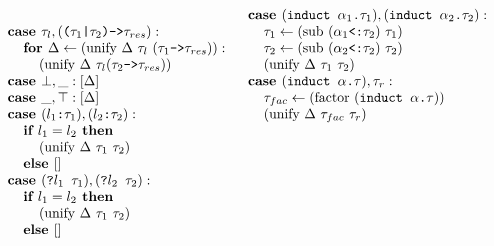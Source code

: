 \documentclass[acmsmall]{acmart}
\begin{document}
\begin{figure*}[h]
\[\begin{array}[t]{@{} l}
    \\

    \I \B{case } \tau_l, (\code{($\tau_1$|$\tau_2$)->$\tau_{res}$}) : 
    \\
    \I\I \B{for } \Delta \leftarrow (\F{unify } \Delta\ \tau_l\ (\code{$\tau_1$->$\tau_{res}$})):
    \\
    \I\I\I (\F{unify } \Delta\ \tau_l (\code{$\tau_2$->$\tau_{res}$})) 

    \\

    \I \B{case } \bot, \_ : [\Delta]

    \\

    \I \B{case } \_, \top : [\Delta]

    \\

    \I \B{case } (\code{$l_1$:$\tau_1$}), (\code{$l_2$:$\tau_2$}) :
    \\
    \I\I \B{if } l_1 = l_2 \B{ then }
    \\
    \I\I\I (\F{unify } \Delta\ \tau_1\ \tau_2)
    \\
    \I\I \B{else } []

    \\

    \I \B{case } (\code{?$l_1$ $\tau_1$}), (\code{?$l_2$ $\tau_2$}) :
    \\
    \I\I \B{if } l_1 = l_2 \B{ then }
    \\
    \I\I\I (\F{unify } \Delta\ \tau_1\ \tau_2)
    \\
    \I\I \B{else } []

\end{array}
\begin{array}[t]{@{} l}
    \I \B{case } (\code{induct $\alpha_1$.$\tau_1$}), (\code{induct $\alpha_2$.$\tau_2$}) :
    \\
    \I\I \tau_1 \leftarrow (\text{sub } (\code{$\alpha_1$<:$\tau_2$})\ \tau_1) 
    \\
    \I\I \tau_2 \leftarrow (\text{sub } (\code{$\alpha_2$<:$\tau_2$})\ \tau_2) 
    \\
    \I\I (\F{unify } \Delta\ \tau_1\ \tau_2)

    \\

    \I \B{case } (\code{induct $\alpha$.$\tau$}), \tau_r :
    \\
    \I\I \tau_{fac} \leftarrow (\text{factor } (\code{induct $\alpha$.$\tau$})) 
    \\
    \I\I (\F{unify } \Delta\ \tau_{fac}\ \tau_r)


\end{array}\]
\end{figure*}
\end{document}
